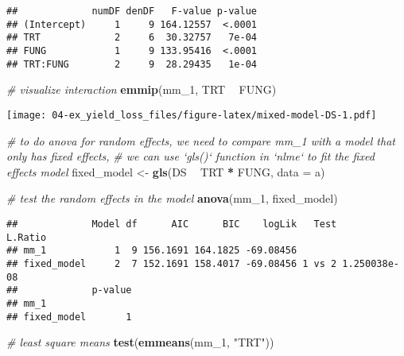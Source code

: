 \documentclass[]{book}
\newenvironment{Shaded}{\begin{snugshade}}{\end{snugshade}}
\newcommand{\CommentTok}[1]{\textcolor[rgb]{0.56,0.35,0.01}{\textit{#1}}}
\newcommand{\DataTypeTok}[1]{\textcolor[rgb]{0.13,0.29,0.53}{#1}}
\newcommand{\DecValTok}[1]{\textcolor[rgb]{0.00,0.00,0.81}{#1}}
\newcommand{\KeywordTok}[1]{\textcolor[rgb]{0.13,0.29,0.53}{\textbf{#1}}}
\newcommand{\NormalTok}[1]{#1}
\newcommand{\OperatorTok}[1]{\textcolor[rgb]{0.81,0.36,0.00}{\textbf{#1}}}
\newcommand{\StringTok}[1]{\textcolor[rgb]{0.31,0.60,0.02}{#1}}
\begin{document}
\begin{verbatim}
##             numDF denDF   F-value p-value
## (Intercept)     1     9 164.12557  <.0001
## TRT             2     6  30.32757   7e-04
## FUNG            1     9 133.95416  <.0001
## TRT:FUNG        2     9  28.29435   1e-04
\end{verbatim}

\begin{Shaded}
\begin{Highlighting}[]
\CommentTok{# visualize interaction}
\KeywordTok{emmip}\NormalTok{(mm_}\DecValTok{1}\NormalTok{, TRT }\OperatorTok{~}\StringTok{ }\NormalTok{FUNG)}
\end{Highlighting}
\end{Shaded}

\texttt{[image: 04-ex\_yield\_loss\_files/figure-latex/mixed-model-DS-1.pdf]}

\begin{Shaded}
\begin{Highlighting}[]
\CommentTok{# to do anova for random effects, we need to compare mm_1 with a model that only has fixed effects,}
\CommentTok{# we can use `gls()` function in `nlme` to fit the fixed effects model}
\NormalTok{fixed_model <-}\StringTok{ }\KeywordTok{gls}\NormalTok{(DS }\OperatorTok{~}\StringTok{ }\NormalTok{TRT }\OperatorTok{*}\StringTok{ }\NormalTok{FUNG,}
                                     \DataTypeTok{data =}\NormalTok{ a)}

\CommentTok{# test the random effects in the model}
\KeywordTok{anova}\NormalTok{(mm_}\DecValTok{1}\NormalTok{, fixed_model)}
\end{Highlighting}
\end{Shaded}

\begin{verbatim}
##             Model df      AIC      BIC    logLik   Test      L.Ratio
## mm_1            1  9 156.1691 164.1825 -69.08456                    
## fixed_model     2  7 152.1691 158.4017 -69.08456 1 vs 2 1.250038e-08
##             p-value
## mm_1               
## fixed_model       1
\end{verbatim}

\begin{Shaded}
\begin{Highlighting}[]
\CommentTok{# least square means}
\KeywordTok{test}\NormalTok{(}\KeywordTok{emmeans}\NormalTok{(mm_}\DecValTok{1}\NormalTok{, }\StringTok{"TRT"}\NormalTok{))}
\end{Highlighting}
\end{Shaded}
\end{document}
